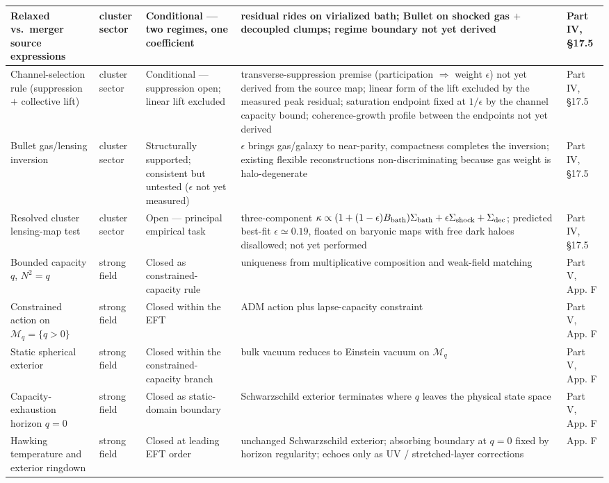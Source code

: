 \documentclass[11pt]{article}
\begin{document}
\begin{longtable}{|L{0.18\textwidth}|L{0.13\textwidth}|L{0.16\textwidth}|L{0.33\textwidth}|L{0.13\textwidth}|}
\hline
Relaxed vs.\ merger source expressions & cluster sector & Conditional --- two regimes, one coefficient & residual rides on virialized bath; Bullet on shocked gas $+$ decoupled clumps; regime boundary not yet derived & Part IV, \S17.5 \\
\hline
Channel-selection rule (suppression $+$ collective lift) & cluster sector & Conditional --- suppression open; linear lift excluded & transverse-suppression premise (participation $\Rightarrow$ weight $\epsilon$) not yet derived from the source map; linear form of the lift excluded by the measured peak residual; saturation endpoint fixed at $1/\epsilon$ by the channel capacity bound; coherence-growth profile between the endpoints not yet derived & Part IV, \S17.5 \\
\hline
Bullet gas/lensing inversion & cluster sector & Structurally supported; consistent but untested ($\epsilon$ not yet measured) & $\epsilon$ brings gas/galaxy to near-parity, compactness completes the inversion; existing flexible reconstructions non-discriminating because gas weight is halo-degenerate & Part IV, \S17.5 \\
\hline
Resolved cluster lensing-map test & cluster sector & Open --- principal empirical task & three-component $\kappa\propto(1+(1-\epsilon)B_{\rm bath})\Sigma_{\rm bath}+\epsilon\Sigma_{\rm shock}+\Sigma_{\rm dec}$; predicted best-fit $\epsilon\simeq0.19$, floated on baryonic maps with free dark haloes disallowed; not yet performed & Part IV, \S17.5 \\
\hline
Bounded capacity $q$, $N^2=q$ & strong field & Closed as constrained-capacity rule & uniqueness from multiplicative composition and weak-field matching & Part V, App. F \\
\hline
Constrained action on $\mathcal{M}_q=\{q>0\}$ & strong field & Closed within the EFT & ADM action plus lapse-capacity constraint & Part V, App. F \\
\hline
Static spherical exterior & strong field & Closed within the constrained-capacity branch & bulk vacuum reduces to Einstein vacuum on $\mathcal{M}_q$ & Part V, App. F \\
\hline
Capacity-exhaustion horizon $q=0$ & strong field & Closed as static-domain boundary & Schwarzschild exterior terminates where $q$ leaves the physical state space & Part V, App. F \\
\hline
Hawking temperature and exterior ringdown & strong field & Closed at leading EFT order & unchanged Schwarzschild exterior; absorbing boundary at $q=0$ fixed by horizon regularity; echoes only as UV / stretched-layer corrections & App. F \\

\end{longtable}
\end{document}
